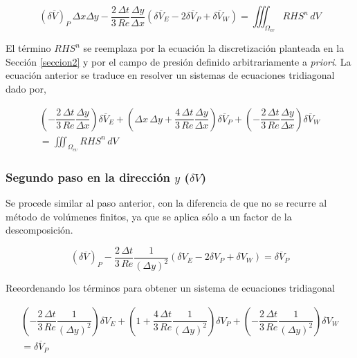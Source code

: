 \begin{equation}
(\delta \overline{V})_P \, \Delta x \Delta y - \dfrac{2 \, \Delta t}{3 \, Re} \dfrac{\Delta y}{\Delta x} \left( \delta \overline{V}_E -2 \delta \overline{V}_P + \delta \overline{V}_W \right) = \iiint_{\Omega_{cv}} RHS^n \, dV
\end{equation}

El término $RHS^n$ se reemplaza por la ecuación la discretización planteada en la Sección \ref{seccion2} y por el campo de presión definido arbitrariamente a \textit{priori}. La ecuación anterior se traduce en resolver un sistemas de ecuaciones tridiagonal dado por,

\begin{equation} \label{hola}
\begin{split}
\left( - \dfrac{2 \, \Delta t}{3 \, Re} \dfrac{\Delta y}{\Delta x}  \right) \delta \overline{V}_E + \left( \Delta x \, \Delta y + \dfrac{4 \, \Delta t}{3 \, Re} \dfrac{\Delta y}{\Delta x}  \right) \delta \overline{V}_P + \left( - \dfrac{2 \, \Delta t}{3 \, Re} \dfrac{\Delta y}{\Delta x}  \right) \delta \overline{V}_W \\
 = \iiint_{\Omega_{cv}} RHS^n \, dV
\end{split}
\end{equation}

\subsubsection{Segundo paso en la dirección $y$ ($\delta V$)}

Se procede similar al paso anterior, con la diferencia de que no se recurre al método de volúmenes finitos, ya que se aplica sólo a un factor de la descomposición.  

\begin{equation}
(\delta \overline{V})_P - \dfrac{2 \, \Delta t}{3 \, Re} \dfrac{1}{(\Delta y)^2} \left( \delta V_E -2 \delta V_P + \delta V_W \right) = \delta \overline{V}_P
\end{equation}

Reeordenando los términos para obtener un sistema de ecuaciones tridiagonal

\begin{equation}
\begin{split}
\left( - \dfrac{2 \, \Delta t}{3 \, Re} \dfrac{1}{(\Delta y)^2}  \right) \delta V_E + \left( 1 + \dfrac{4 \, \Delta t}{3 \, Re} \dfrac{1}{(\Delta y)^2}  \right) \delta V_P + \left( - \dfrac{2 \, \Delta t}{3 \, Re} \dfrac{1}{(\Delta y)^2}  \right) \delta V_W \\
 = \delta \overline{V}_P
\end{split}
\end{equation}

